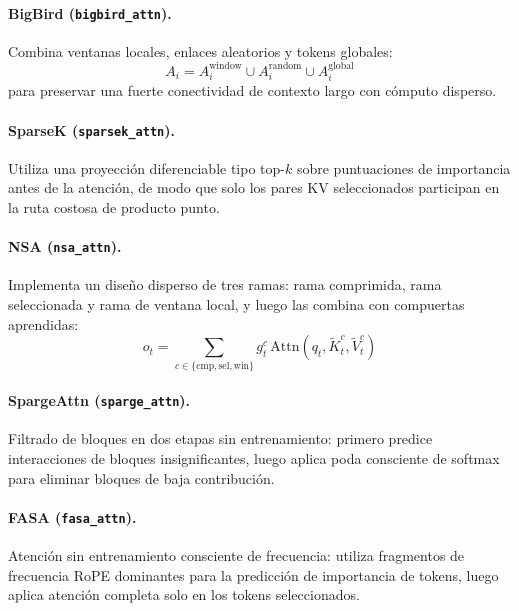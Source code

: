 \documentclass[11pt,a4paper]{article}
\begin{document}
\paragraph{BigBird (\texttt{bigbird\_attn}).}
Combina ventanas locales, enlaces aleatorios y tokens globales:
\[
A_i=A_i^{\text{window}}\cup A_i^{\text{random}}\cup A_i^{\text{global}}
\]
para preservar una fuerte conectividad de contexto largo con cómputo disperso.
\citep{zaheer_bigbird_2020}

\paragraph{SparseK (\texttt{sparsek\_attn}).}
Utiliza una proyección diferenciable tipo top-$k$ sobre puntuaciones de importancia antes de la atención, de modo que solo los pares KV seleccionados participan en la ruta costosa de producto punto.
\citep{lou_sparsek_2024}

\paragraph{NSA (\texttt{nsa\_attn}).}
Implementa un diseño disperso de tres ramas: rama comprimida, rama seleccionada y rama de ventana local, y luego las combina con compuertas aprendidas:
\[
o_t=\sum_{c\in\{\text{cmp},\text{sel},\text{win}\}} g_t^c\,\text{Attn}(q_t,\tilde K_t^c,\tilde V_t^c)
\]
\citep{yuan_nsa_2025}

\paragraph{SpargeAttn (\texttt{sparge\_attn}).}
Filtrado de bloques en dos etapas sin entrenamiento: primero predice interacciones de bloques insignificantes, luego aplica poda consciente de softmax para eliminar bloques de baja contribución.
\citep{zhang_spargeattn_2025}

\paragraph{FASA (\texttt{fasa\_attn}).}
Atención sin entrenamiento consciente de frecuencia: utiliza fragmentos de frecuencia RoPE dominantes para la predicción de importancia de tokens, luego aplica atención completa solo en los tokens seleccionados.
\citep{wang_fasa_2026}
\end{document}

